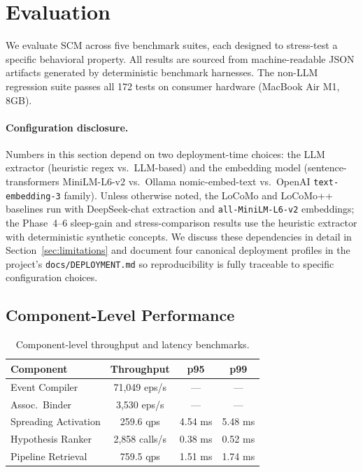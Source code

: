 \documentclass[11pt,twocolumn]{article}
\begin{document}
\section{Evaluation}

We evaluate SCM across five benchmark suites, each designed to stress-test a specific behavioral property. All results are sourced from machine-readable JSON artifacts generated by deterministic benchmark harnesses. The non-LLM regression suite passes all 172 tests on consumer hardware (MacBook Air M1, 8GB).

\paragraph{Configuration disclosure.} Numbers in this section depend on two deployment-time choices: the LLM extractor (heuristic regex vs.\ LLM-based) and the embedding model (sentence-transformers MiniLM-L6-v2 vs.\ Ollama nomic-embed-text vs.\ OpenAI \texttt{text-embedding-3} family). Unless otherwise noted, the LoCoMo and LoCoMo++ baselines run with DeepSeek-chat extraction and \texttt{all-MiniLM-L6-v2} embeddings; the Phase~4--6 sleep-gain and stress-comparison results use the heuristic extractor with deterministic synthetic concepts. We discuss these dependencies in detail in Section~\ref{sec:limitations} and document four canonical deployment profiles in the project's \texttt{docs/DEPLOYMENT.md} so reproducibility is fully traceable to specific configuration choices.

\subsection{Component-Level Performance}

\begin{table}[t]
\centering
\caption{Component-level throughput and latency benchmarks.}
\label{tab:components}
{\footnotesize
\begin{tabular}{@{}lccc@{}}
\toprule
\textbf{Component} & \textbf{Throughput} & \textbf{p95} & \textbf{p99} \\
\midrule
Event Compiler          & 71,049 eps/s   & ---   & --- \\
Assoc.\ Binder          & 3,530 eps/s    & ---   & --- \\
Spreading Activation    & 259.6 qps      & 4.54 ms & 5.48 ms \\
Hypothesis Ranker       & 2,858 calls/s  & 0.38 ms & 0.52 ms \\
Pipeline Retrieval      & 759.5 qps      & 1.51 ms & 1.74 ms \\
\bottomrule
\end{tabular}}
\end{table}
\end{document}
